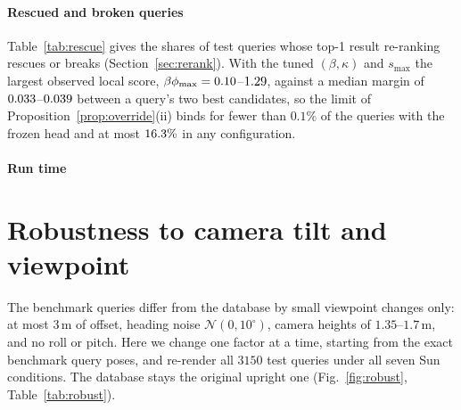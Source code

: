 \documentclass[letterpaper,journal]{IEEEtran}
\begin{document}
\paragraph*{Rescued and broken queries} Table~\ref{tab:rescue} gives the shares of test queries whose top-1
result re-ranking rescues or breaks (Section~\ref{sec:rerank}). With the tuned $(\beta,\kappa)$ and $s_{\max}$ the largest
observed local score, $\beta\phi_{\max}=0.10$--$1.29$, against a median margin of
$0.033$--$0.039$ between a query's two best candidates, so the limit of
Proposition~\ref{prop:override}(ii) binds for fewer than $0.1\%$ of the queries with the frozen head and at most
$16.3\%$ in any configuration.

\paragraph*{Run time}



\section{Robustness to camera tilt and viewpoint}\label{sec:robust}
The benchmark queries differ from the database by small viewpoint changes only: at most $3$\,m of offset,
heading noise $\mathcal{N}(0,10^\circ)$, camera heights of $1.35$--$1.7$\,m, and no roll or pitch. Here
we change one factor at a time, starting from the exact benchmark query poses, and re-render all $3150$ test
queries under all seven Sun conditions. The database stays the original upright one
(Fig.~\ref{fig:robust}, Table~\ref{tab:robust}).
\end{document}
